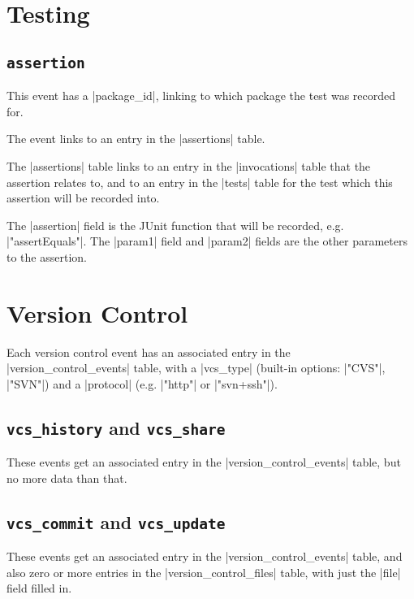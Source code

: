 \documentclass{book}
\begin{document}
\section{Testing}

\subsection{\lstinline|assertion|}

This event has a |package_id|, linking to which package the test was
recorded for.

The event links to an entry in the |assertions| table.


The |assertions| table links to an entry in the |invocations| table that the assertion
relates to, and to an entry in the |tests| table for the test which
this assertion will be recorded into.

The |assertion| field is the JUnit function that will be recorded,
e.g. |"assertEquals"|.  The |param1| field and |param2| fields are
the other parameters to the assertion.

\section{Version Control}



Each version control event has an associated entry in the
|version_control_events| table, with a |vcs_type| (built-in options:
|"CVS"|, |"SVN"|) and a |protocol| (e.g. |"http"| or |"svn+ssh"|).

\subsection{\lstinline|vcs_history| and \lstinline|vcs_share|}

These events get an associated entry in the |version_control_events|
table, but no more data than that.

\subsection{\lstinline|vcs_commit| and \lstinline|vcs_update|}

These events get an associated entry in the |version_control_events|
table, and also zero or more entries in the |version_control_files|
table, with just the |file| field filled in.
\end{document}
